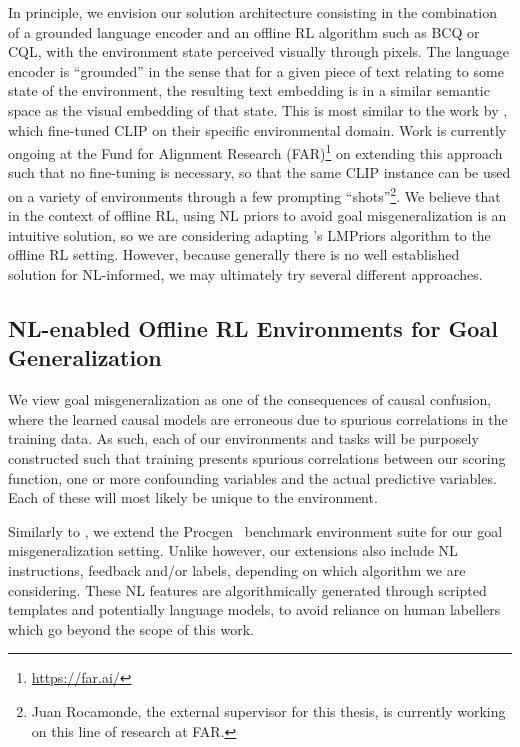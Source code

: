\documentclass[../thesis-proposal/main.tex]{subfiles}
\begin{document}
In principle, we envision our solution architecture consisting in the combination of a grounded
language encoder and an offline RL algorithm such as BCQ or CQL, with the environment state
perceived visually through pixels. The language encoder is ``grounded'' in the sense that for
a given piece of text relating to some state of the environment, the resulting text embedding is in
a similar semantic space as the visual embedding of that state. This is most similar to the work by
\citet{fan_minedojo_2022}, which fine-tuned CLIP \citep{radford_learning_2021} on their specific
environmental domain. Work is currently ongoing at the Fund for Alignment Research
(FAR)\footnote{\href{https://far.ai/}{https://far.ai/}} on extending this approach such that no
fine-tuning is necessary, so that the same CLIP instance can be used on a variety of environments
through a few prompting ``shots''\footnote{Juan Rocamonde, the external supervisor for this thesis,
is currently working on this line of research at FAR.}. We believe that in the context of offline
RL, using NL priors to avoid goal misgeneralization is an intuitive solution, so we are considering
adapting \citet{choi_lmpriors_2022}'s LMPriors algorithm to the offline RL setting. However, because
generally there is no well established solution for NL-informed, we may ultimately try several
different approaches.

\subsection{NL-enabled Offline RL Environments for Goal Generalization}

We view goal misgeneralization as one of the consequences of causal confusion, where the learned
causal models are erroneous due to spurious correlations in the training data. As such, each of our
environments and tasks will be purposely constructed such that training presents spurious
correlations between our scoring function, one or more confounding variables and the actual
predictive variables. Each of these will most likely be unique to the environment.

Similarly to \citet{langosco_goal_2022}, we extend the Procgen~\citep{cobbe_leveraging_2020}
benchmark environment suite for our goal misgeneralization setting. Unlike
\citet{langosco_goal_2022} however, our extensions also include NL instructions, feedback and/or
labels, depending on which algorithm we are considering. These NL features are algorithmically
generated through scripted templates and potentially language models, to avoid reliance on human
labellers which go beyond the scope of this work.
\end{document}
